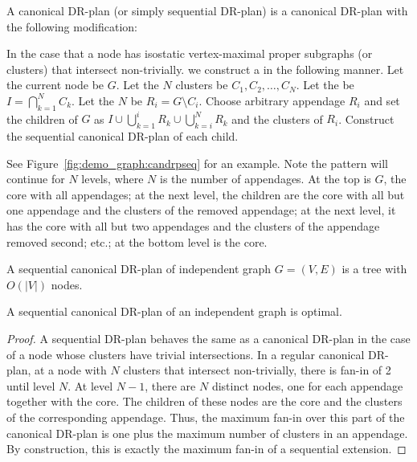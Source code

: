 \begin{definition}
    A  canonical DR-plan (or simply sequential DR-plan) is a canonical DR-plan with the following modification:

    In the case that a node has isostatic vertex-maximal proper subgraphs (or clusters) that intersect non-trivially.
    we construct a  in the following manner.
    Let the current node be $G$.
    Let the $N$ clusters be $C_1, C_2, \ldots, C_N$.
    Let the  be $I=\bigcap_{k=1}^{N}{C_k}$.
    Let the $N$  be $R_i = G\setminus C_i$.
    Choose arbitrary appendage $R_i$ and set the children of $G$ as $I\cup \bigcup_{k=1}^{i}{R_k}\cup \bigcup_{k=i}^{N}{R_k}$ and the clusters of $R_i$. Construct the sequential canonical DR-plan of each child.
\end{definition}

See Figure~\ref{fig:demo_graph:candrpseq} for an example. Note the pattern will continue for $N$ levels, where $N$ is the number of appendages. At the top is $G$, the core with all appendages; at the next level, the children are the core with all but one appendage and the clusters of the removed appendage; at the next level, it has the core with all but two appendages and the clusters of the appendage removed second; etc.; at the bottom level is the core.

\begin{observation}
    A sequential canonical DR-plan of independent graph $G=(V,E)$ is a tree with $O(|V|)$ nodes.
\end{observation}

\begin{observation}
    A sequential canonical DR-plan of an independent graph is optimal.
\end{observation}

\begin{proof}
    A sequential DR-plan behaves the same as a canonical DR-plan in the case of a node whose clusters have trivial intersections.
    In a regular canonical DR-plan, at a node with $N$ clusters that intersect non-trivially, there is fan-in of 2 until level $N$. At level $N-1$, there are $N$ distinct nodes, one for each appendage together with the core. The children of these nodes are the core and the clusters of the corresponding appendage. Thus, the maximum fan-in over this part of the canonical DR-plan is one plus the maximum number of clusters in an appendage. By construction, this is exactly the maximum fan-in of a sequential extension.
\end{proof}

